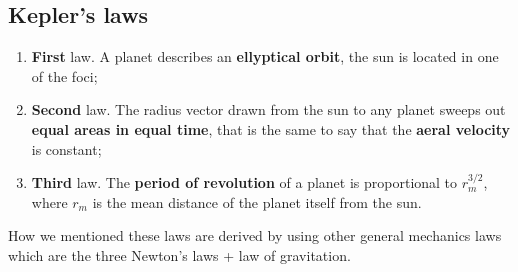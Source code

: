 \subsection{Kepler's laws}
\begin{enumerate}
    \item \textsf{\textbf{First} law}. A planet describes an \textbf{ellyptical orbit}, the sun is located in one of the foci; 
    \item \textsf{\textbf{Second} law}. The radius vector drawn from the sun to any planet sweeps out \textbf{equal areas in equal time}, that is the same to say that the \textbf{aeral velocity} is constant; 
    \item \textsf{\textbf{Third} law}. The \textbf{period of revolution} of a planet is proportional to $r_m^{3/2}$, where $r_m$ is the mean distance of the planet itself from the sun. 
\end{enumerate}

How we mentioned these laws are derived by using other general mechanics laws which are the three Newton's laws + law of gravitation.

